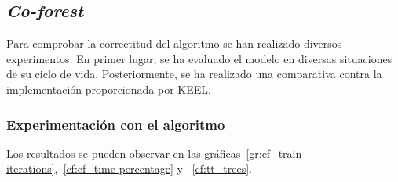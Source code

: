 \subsection{\textit{Co-forest}}

Para comprobar la correctitud del algoritmo se han realizado diversos experimentos. En primer lugar, se ha evaluado el modelo en diversas situaciones de su ciclo de vida. Posteriormente, se ha realizado una comparativa contra la implementación proporcionada por KEEL.

\subsubsection{Experimentación con el algoritmo}

Los resultados se pueden observar en las gráficas~\ref{gr:cf_train-iterations},~\ref{cf:cf_time-percentage} y ~\ref{cf:tt_trees}.


